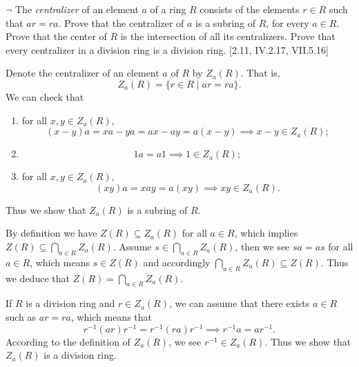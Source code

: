 \documentclass[12pt,letterpaper,boxed]{hmcpset}
\begin{document}
\hypertarget{Exercise III.2.10}{}
\begin{problem}[2.10]
$\neg$ The \emph{centralizer} of an element $a$ of a ring $R$ consists of the elements $r \in R$ such that $ar = ra$. Prove that the centralizer of $a$ is a subring of $R$, for every $a\in R$. Prove that the center of $R$ is the intersection of all its centralizers. Prove that every centralizer in a division ring is a division ring. [2.11, IV.2.17, VII.5.16]
\end{problem}
\begin{solution}
Denote the centralizer of an element $a$ of $R$ by $Z_a(R)$. That is,
\[
Z_a(R)=\{r\in R\mid ar=ra\}.
\] 
We can check that
\begin{enumerate}
	\item for all $x,y\in Z_a(R)$, $$(x-y)a=xa-ya=ax-ay=a(x-y)\implies x-y\in Z_a(R);$$ 
	\item 
	\[
	1a=a1\implies 1\in Z_a(R);
	\]
	\item for all $x,y\in Z_a(R)$,
	\[
	(xy)a=xay=a(xy)\implies xy\in Z_a(R).
	\]
\end{enumerate}
Thus we show that $Z_a(R)$ is a subring of $R$. 

By definition we have $Z(R)\subseteq Z_a(R)$ for all $a\in R$, which implies $Z(R)\subseteq \bigcap_{a\in R} Z_a(R)$. Assume $s\in\bigcap_{a\in R} Z_a(R)$, then we see $sa=as$ for all $a\in R$, which means $s\in Z(R)$ and accordingly $\bigcap_{a\in R} Z_a(R)\subseteq Z(R)$. Thus we deduce that $Z(R)=\bigcap_{a\in R} Z_a(R)$.

If $R$ is a division ring and $r\in Z_a(R)$, we can assume that there exists $a\in R$ such as $ar=ra$, which means that
\[
r^{-1}(ar)r^{-1}=r^{-1}(ra)r^{-1}\implies r^{-1}a=ar^{-1}.
\]
According to the definition of $Z_a(R)$, we see $r^{-1}\in Z_a(R)$. Thus we show that $Z_a(R)$ is a division ring.
\end{solution}
\end{document}
